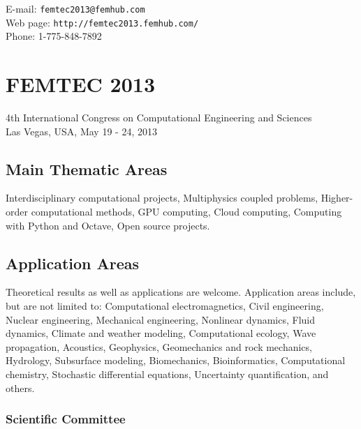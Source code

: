 \documentclass[article, A4, 11pt]{llncs}%
\begin{document}
\noindent
E-mail: {\tt femtec2013@femhub.com}\\
Web page: {\tt http://femtec2013.femhub.com/}\\
Phone: 1-775-848-7892

\chapter*{\huge FEMTEC 2013}
\vspace{-5mm}
\normalsize
\begin{center}
4th International Congress on Computational Engineering and Sciences\\ Las Vegas, USA, May 19 - 24, 2013
\end{center}
\vspace{-3mm}

\section*{Main Thematic Areas}%

Interdisciplinary computational projects, Multiphysics coupled problems, Higher-order computational methods, GPU computing, Cloud computing, Computing with Python and Octave, Open source projects.


\section*{Application Areas}%

Theoretical results as well as applications are welcome. Application areas include, but are not limited to: Computational electromagnetics, Civil engineering, Nuclear engineering, Mechanical engineering, Nonlinear dynamics, Fluid dynamics, Climate and weather modeling, Computational ecology, Wave propagation, Acoustics, Geophysics, Geomechanics and rock mechanics, Hydrology, Subsurface modeling, Biomechanics, Bioinformatics, Computational chemistry, Stochastic differential equations, Uncertainty quantification, and others.

\subsection*{Scientific Committee}%

\end{document}
